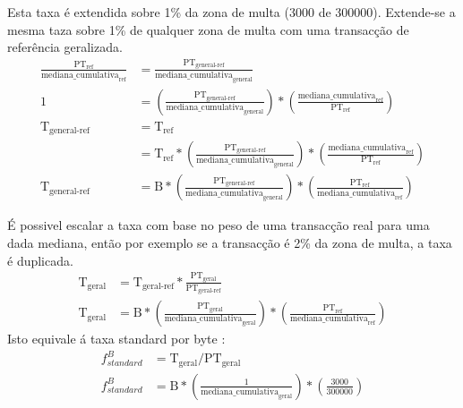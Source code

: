 Esta taxa é extendida sobre 1\% da zona de multa (3000 de 300000). Extende-se a mesma taza sobre 1\% de qualquer zona de multa com uma transacção de referência geralizada. 
\vspace{.175cm}
\begin{align*}
    \frac{\textrm{PT}_{\textrm{ref}}}{\textrm{mediana\_cumulativa}_{\textrm{ref}}} &= \frac{\textrm{PT}_{\textrm{general-ref}}}{\textrm{mediana\_cumulativa}_{\textrm{general}}}\\
    1 &= (\frac{\textrm{PT}_{\textrm{general-ref}}}{\textrm{mediana\_cumulativa}_{\textrm{general}}}) * (\frac{\textrm{mediana\_cumulativa}_{\textrm{ref}}}{\textrm{PT}_{\textrm{ref}}})\\
    \textrm{T}_{\textrm{general-ref}} &= \textrm{T}_{\textrm{ref}}\\
    &= \textrm{T}_{\textrm{ref}}*(\frac{\textrm{PT}_{\textrm{general-ref}}}{\textrm{mediana\_cumulativa}_{\textrm{general}}}) * (\frac{\textrm{mediana\_cumulativa}_{\textrm{ref}}}{\textrm{PT}_{\textrm{ref}}})\\
    \textrm{T}_{\textrm{general-ref}} &= \textrm{B}*(\frac{\textrm{PT}_{\textrm{general-ref}}}{\textrm{mediana\_cumulativa}_{\textrm{general}}}) * (\frac{\textrm{PT}_{\textrm{ref}}}{\textrm{mediana\_cumulativa}_{\textrm{ref}}})
\end{align*}

É possivel escalar a taxa com base no peso de uma transacção real para uma dada mediana, então por exemplo se a transacção é 2\% da zona de multa, a taxa é duplicada. 
\vspace{.175cm}
\begin{align*}
    \textrm{T}_{\textrm{geral}} &= \textrm{T}_{\textrm{geral-ref}} * \frac{\textrm{PT}_{\textrm{geral}}}{\textrm{PT}_{\textrm{geral-ref}}}\\
    \textrm{T}_{\textrm{geral}} &= \textrm{B}*(\frac{\textrm{PT}_{\textrm{geral}}}{\textrm{mediana\_cumulativa}_{\textrm{geral}}}) * (\frac{\textrm{PT}_{\textrm{ref}}}{\textrm{mediana\_cumulativa}_{\textrm{ref}}})
\end{align*}
Isto equivale á taxa standard por byte :
\vspace{.175cm}
\begin{align*}
    f^{B}_{standard} &= \textrm{T}_{\textrm{geral}}/\textrm{PT}_{\textrm{geral}}\\
    f^{B}_{standard} &= \textrm{B}*(\frac{1}{\textrm{mediana\_cumulativa}_{\textrm{geral}}}) * (\frac{3000}{300000})
\end{align*}{}

